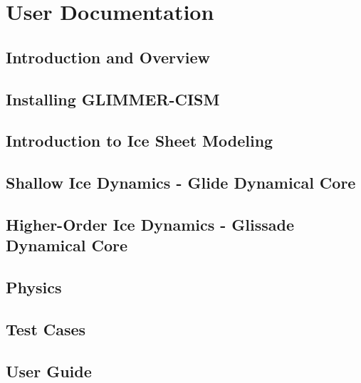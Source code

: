 \mainmatter
\part{User Documentation}

\chapter{Introduction and Overview}
\newcommand{\dir}{intro}


\chapter{Installing GLIMMER-CISM}
\renewcommand{\dir}{install}


\chapter{Introduction to Ice Sheet Modeling}
\renewcommand{\dir}{modeling-intro}


\chapter{Shallow Ice Dynamics - Glide Dynamical Core}
\renewcommand{\dir}{shallow-ice}


\chapter{Higher-Order Ice Dynamics - Glissade Dynamical Core}
\renewcommand{\dir}{higher-order}


\chapter{Physics}
\renewcommand{\dir}{physics}


\chapter{Test Cases}
\label{sec:testcases}
\renewcommand{\dir}{tests}



\chapter{User Guide}
\renewcommand{\dir}{ug}


